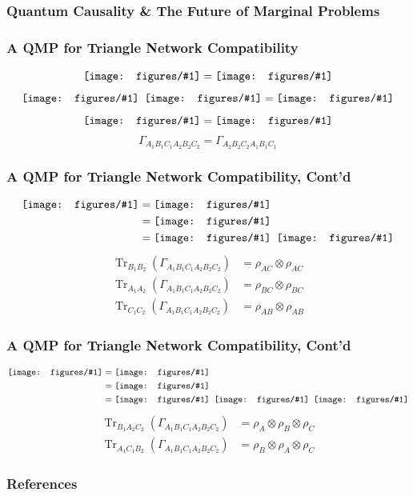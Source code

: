 \documentclass[
    9pt,
    hyperref={bookmarks=false, colorlinks=false}, %
    xcolor={dvipsnames},
]{beamer}
\DeclareMathOperator{\Tr}{Tr}
\newcommand{\incstr}[1]{\vcenter{\hbox{\texttt{[image: figures/\#1]}}}} %
\begin{document}
\begin{frame}
    \frametitle{Quantum Causality \& The Future of Marginal Problems}
\end{frame}

\begin{frame}
    \frametitle{A QMP for Triangle Network Compatibility}
    \[ \incstr{triangle_state.pdf} = \incstr{triangle_production.pdf} \]
    \[ \incstr{triangle_state.pdf}\hspace{0.5em}\incstr{triangle_state.pdf} = \incstr{triangle_production_double.pdf} \]
    \[ \incstr{triangle_sextuple.pdf} = \incstr{triangle_production_ring.pdf} \]
    \[ \Gamma_{A_1B_1C_1A_2B_2C_2} = \Gamma_{A_2B_2C_2A_1B_1C_1} \]
\end{frame}

\begin{frame}
    \frametitle{A QMP for Triangle Network Compatibility, Cont'd}
    \begin{align*}
        \incstr{triangle_sextuple_discard.pdf} 
        &= \incstr{triangle_production_ring_discard.pdf} \\
        &= \incstr{triangle_production_ring_discard_pulldown.pdf} \\
        &= \incstr{triangle_marg_state_Ac.pdf} \hspace{0.5em}\incstr{triangle_marg_state_Ac.pdf}
    \end{align*}
    \begin{align*}
        \Tr_{B_1B_2}(\Gamma_{A_1B_1C_1A_2B_2C_2}) &= \rho_{AC} \otimes \rho_{AC} \\
        \Tr_{A_1A_2}(\Gamma_{A_1B_1C_1A_2B_2C_2}) &= \rho_{BC} \otimes \rho_{BC} \\
        \Tr_{C_1C_2}(\Gamma_{A_1B_1C_1A_2B_2C_2}) &= \rho_{AB} \otimes \rho_{AB}
    \end{align*}
\end{frame}

\begin{frame}
    \frametitle{A QMP for Triangle Network Compatibility, Cont'd}
    \begin{align*}
        \incstr{triangle_sextuple_discard_3.pdf} 
        &= \incstr{triangle_production_ring_discard_3.pdf} \\
        &= \incstr{triangle_production_ring_discard_3_pulldown.pdf} \\
        &= \incstr{triangle_marg_state_A.pdf} \hspace{0.5em}\incstr{triangle_marg_state_C.pdf}\hspace{0.5em}\incstr{triangle_marg_state_B.pdf}
    \end{align*}
    \begin{align*}
        \Tr_{B_1A_2C_2}(\Gamma_{A_1B_1C_1A_2B_2C_2}) &= \rho_{A} \otimes \rho_{B} \otimes \rho_{C} \\
        \Tr_{A_1C_1B_2}(\Gamma_{A_1B_1C_1A_2B_2C_2}) &= \rho_{B} \otimes \rho_{A} \otimes \rho_{C}
    \end{align*}
\end{frame}


\begin{frame}[allowframebreaks]
    \frametitle{References}
    \printbibliography
\end{frame}
\end{document}

